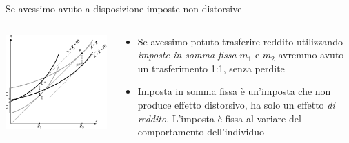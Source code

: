 \documentclass[11pt]{beamer}
\begin{document}
\begin{frame}{Se avessimo avuto a disposizione imposte non distorsive}
\begin{columns}
\begin{column}{.55\columnwidth}
\begin{center}
\includegraphics[width=\textwidth]{./figure/effetto-distorsivo-imposte-ql-5.pdf}
\end{center}
\end{column}

\begin{column}{.45\columnwidth}
\begin{itemize}
\item Se avessimo potuto trasferire reddito utilizzando \emph{imposte in somma fissa} $m_1$ e $m_2$ avremmo avuto un trasferimento 1:1, senza perdite
\item Imposta in somma fissa è un'imposta che non produce effetto distorsivo, ha solo un effetto \emph{di reddito}. L'imposta è fissa al variare del comportamento dell'individuo
\end{itemize}
\end{column}
\end{columns}
\end{frame}
\end{document}

